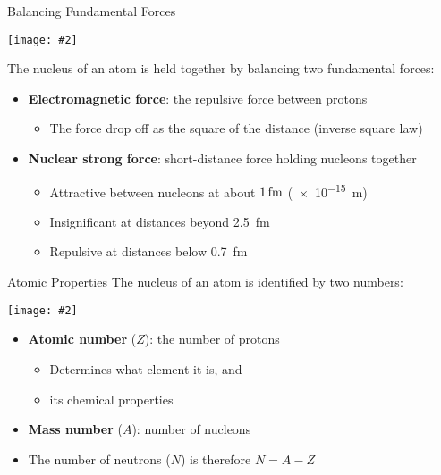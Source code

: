 \documentclass[12pt,compress,aspectratio=169]{beamer}
\newcommand{\pic}[2]{\texttt{[image: \#2]}}
\begin{document}
\begin{frame}{Balancing Fundamental Forces}
  \begin{center}
    \pic{.25}{graphics/Radioact}
  \end{center}
  The nucleus of an atom is held together by balancing two fundamental forces:
  \begin{itemize}
  \item\textbf{Electromagnetic force}: the repulsive force between protons
    \begin{itemize}
    \item The force drop off as the square of the distance (inverse square law)
    \end{itemize}
  \item\textbf{Nuclear strong force}: short-distance force
    holding nucleons together
    \begin{itemize}
    \item Attractive between nucleons at about $\SI1{\femto\metre}$
      (\SI{e-15}{\metre})
    \item Insignificant at distances beyond \SI{2.5}{\femto\metre}
    \item  Repulsive at distances below \SI{.7}{\femto\metre}
    \end{itemize}
  \end{itemize}
\end{frame}


  


\begin{frame}{Atomic Properties}
  The nucleus of an atom is identified by two numbers:
  \begin{center}
    \pic{.45}{graphics/helium-notation}
  \end{center}
  \begin{itemize}
  \item\textbf{Atomic number} ($Z$): the number of protons
    \begin{itemize}
    \item Determines what element it is, and 
    \item its chemical properties
    \end{itemize}
  \item\textbf{Mass number} ($A$): number of nucleons
  \item The number of neutrons ($N$) is therefore $N=A-Z$
  \end{itemize}
\end{frame}
\end{document}

